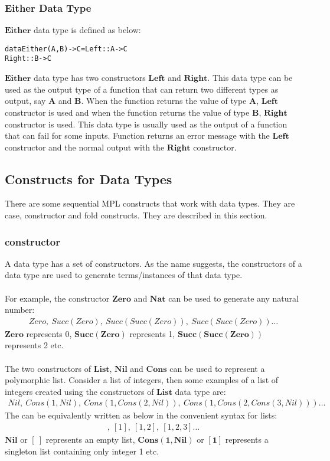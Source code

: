 \documentclass[11pt]{article}
\begin{document}
\subsubsection {Either Data Type}
$\mathbf{Either}$ data type is defined as below:
\begin{alltt}
          data Either(A,B) -> C = Left   :: A -> C 
                                  Right  :: B -> C
\end{alltt}
$\mathbf{Either}$ data type has two constructors $\mathbf{Left}$ and $\mathbf{Right}$. This data type can be used as the output type of a function that can return two different types as output, say $\mathbf{A}$ and $\mathbf{B}$. When the function returns the value of type $\mathbf{A}$, $\mathbf{Left}$ constructor is used and when the function returns the value of type $\mathbf{B}$, $\mathbf{Right}$ constructor is used. This data type is usually used as the output of a function that can fail for some inputs. Function returns an error message with the $\mathbf{Left}$ constructor and the normal output with the $\mathbf{Right}$ constructor.

\subsection {Constructs for Data Types}\label{SeqMPL:dataConstruct}
There are some sequential MPL constructs that work with data types. They are {\sf case}, {\sf constructor} and {\sf fold} constructs. They are described in this section.

\subsubsection {constructor}\label{SeqMPL:consConstruct}
A data type has a set of {\sf constructors}. As the name suggests, the {\sf constructors} of a data type are used to generate terms/instances of that data type.
~~\\~~\\
For example, the constructor $\mathbf{Zero}$ and $\mathbf{Nat}$ can be used to generate any natural number:
\begin{align*}
  Zero,~Succ(Zero),~Succ(Succ(Zero)),~Succ(Succ(Zero))\ldots
\end{align*}
$\mathbf{Zero}$ represents 0, $\mathbf{Succ(Zero)}$ represents 1, $\mathbf{Succ(Succ(Zero))}$ represents 2 etc. 
~~\\~~\\
The two constructors of $\mathbf{List}$, $\mathbf{Nil}$ and $\mathbf{Cons}$ can be used to represent a polymorphic list. Consider a list of integers, then some examples of a list of integers created using the constructors of $\mathbf{List}$ data type are:
\begin{align*}
  Nil,~Cons(1,Nil),~Cons(1,Cons(2,Nil)),~Cons(1,Cons(2,Cons(3,Nil)))\ldots
\end{align*}
The can be equivalently written as below in the convenient syntax for lists:
\begin{align*}
  [~],~[1],~[1,2],~[1,2,3]\ldots
\end{align*}
$\mathbf{Nil}$ or $\mathbf{[~]}$ represents an empty list, $\mathbf{Cons(1,Nil)}$ or $\mathbf{[1]}$ represents a singleton list containing only integer 1 etc. 
\end{document}
